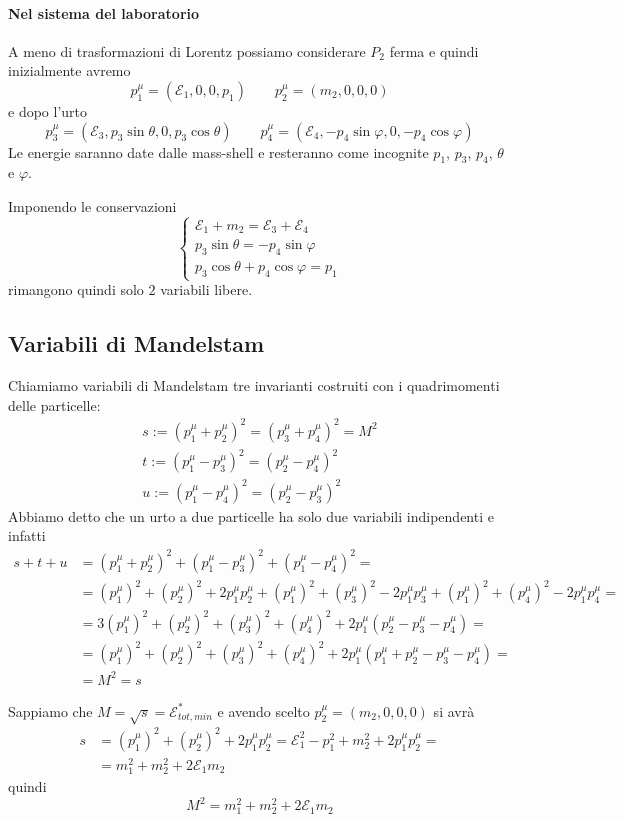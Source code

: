 \documentclass[12pt,a4paper,titlepage, twoside, openright]{book}
\numberwithin{equation}{chapter}
\begin{document}
\paragraph{Nel sistema del laboratorio}
A meno di trasformazioni di Lorentz possiamo considerare $P_2$ ferma e quindi inizialmente avremo
\[
p_1^\mu=(\mathcal{E}_1,0,0,p_1) \qquad  p_2^\mu=(m_2,0,0,0)
\]
e dopo l'urto
\[
p^\mu_3=(\mathcal{E}_3,p_3\sin{\theta},0,p_3\cos{\theta}) \qquad
p^\mu_4=(\mathcal{E}_4,-p_4\sin{\varphi},0,-p_4\cos{\varphi})
\]
Le energie saranno date dalle mass-shell e resteranno come incognite $p_1$, $p_3$, $p_4$, $\theta$ e $\varphi$.

Imponendo le conservazioni
\[
\begin{cases}
\mathcal{E}_1+m_2=\mathcal{E}_3+\mathcal{E}_4 \\
p_3\sin{\theta} = -p_4\sin{\varphi} \\
p_3\cos{\theta}+p_4\cos{\varphi}=p_1
\end{cases}
\]
rimangono quindi solo $2$ variabili libere.

\subsection{Variabili di Mandelstam}
Chiamiamo variabili di Mandelstam tre invarianti costruiti con i quadrimomenti delle particelle:
\begin{gather}
s:=(p_1^\mu+p_2^\mu)^2 =(p_3^\mu+p_4^\mu)^2=M^2 \\
t:=(p_1^\mu-p_3^\mu)^2=(p_2^\mu-p_4^\mu)^2 \\
u:=(p_1^\mu-p_4^\mu)^2=(p_2^\mu-p_3^\mu)^2
\end{gather}
Abbiamo detto che un urto a due particelle ha solo due variabili indipendenti e infatti
\begin{align*}
s+t+u &= (p_1^\mu+p_2^\mu)^2+(p_1^\mu-p_3^\mu)^2+(p_1^\mu-p_4^\mu)^2=\\
&=(p_1^\mu)^2+(p_2^\mu)^2+2p_1^\mu p_2^\mu+(p_1^\mu)^2+(p_3^\mu)^2-2p_1^\mu p_3^\mu + (p_1^\mu)^2+(p_4^\mu)^2-2p_1^\mu p_4^\mu =\\
&=3(p_1^\mu)^2 + (p_2^\mu)^2 + (p_3^\mu)^2 + (p_4^\mu)^2 +2p_1^\mu \left( p_2^\mu-p_3^\mu-p_4^\mu \right)=\\
&=(p_1^\mu)^2 + (p_2^\mu)^2 + (p_3^\mu)^2 + (p_4^\mu)^2 +2p_1^\mu \left( p_1^\mu + p_2^\mu-p_3^\mu-p_4^\mu \right)=\\
&=M^2=s
\end{align*}

Sappiamo che $M=\sqrt{s}=\mathcal{E}_{tot,min}^*$ e avendo scelto $p_2^\mu = \left( m_2, 0, 0, 0 \right)$ si avrà
\begin{align*}
s&=(p_1^\mu)^2+(p_2^\mu)^2+2p_1^\mu p_2^\mu = \mathcal{E}_1^2 - p_1^2 + m_2^2 +2p_1^\mu p_2^\mu=\\
&=m_1^2+m_2^2+2\mathcal{E}_1 m_2
\end{align*}
quindi
\begin{equation}
M^2=m_1^2+m_2^2+2\mathcal{E}_1m_2
\end{equation}
\end{document}
